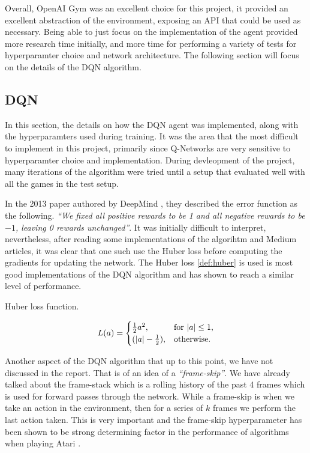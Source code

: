 Overall, OpenAI Gym was an excellent choice for this project, it provided an excellent abstraction of the environment, exposing an API that could be used as necessary. Being able to just focus on the implementation of the agent provided more research time initially, and more time for performing a variety of tests for hyperparamter choice and network architecture. The following section will focus on the details of the DQN algorithm.

\subsection{DQN}
\label{imple:dqn}

In this section, the details on how the DQN agent was implemented, along with the hyperparamters used during training. It was the area that the most difficult to implement in this project, primarily since Q-Networks are very sensitive to hyperparamter choice and implementation. During devleopment of the project, many iterations of the algorithm were tried until a setup that evaluated well with all the games in the test setup.

In the 2013 paper authored by DeepMind \cite{dqn}, they described the error function as the following. \textit{``We fixed all positive rewards to be 1 and all negative rewards to be $-1$, leaving 0 rewards unchanged''}. It was initially difficult to interpret, nevertheless, after reading some implementations of the algorihtm and Medium articles, it was clear that one such use the Huber loss before computing the gradients for updating the network. The Huber loss \ref{def:huber} is used is most good implementations of the DQN algorithm and has shown to reach a similar level of performance.

\begin{defn}
	Huber loss function.

	\begin{equation}
		L(a)=\begin{cases}
			\frac{1}{2}a^2,          & \text{for $\abs{a} \leq 1$}, \\
			(\abs{a} - \frac{1}{2}), & \text{otherwise}.
		\end{cases}
	\end{equation}
	\label{def:huber}
\end{defn}

Another aspect of the DQN algorithm that up to this point, we have not discussed in the report. That is of an idea of a \textit{``frame-skip''}. We have already talked about the frame-stack which is a rolling history of the past 4 frames which is used for forward passes through the network. While a frame-skip is when we take an action in the environment, then for a series of $k$ frames we perform the last action taken. This is very important and the frame-skip hyperparameter has been shown to be strong determining factor in the performance of algorithms when playing Atari \cite{braylan2015frame}.

